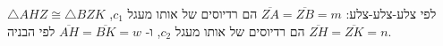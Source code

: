 
$\triangle AHZ\cong\triangle BZK$
לפי צלע-צלע-צלע: 
$\overline{ZA}=\overline{ZB}=m$
הם רדיוסים של אותו מעגל
$c_1$,
$\overline{ZH}=\overline{ZK}=n$
הם רדיוסים של אותו מעגל
$c_2$,
ו-%
$\overline{AH}=\overline{BK}=w$
לפי הבניה.

